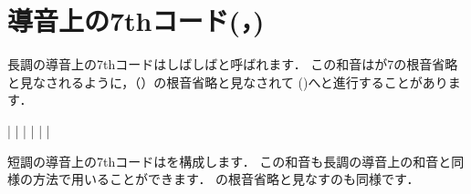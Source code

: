 \documentclass[dvipdfmx,uplatex,b5paper,openany,jbase=12Q,nomag*,textwidth-limit=44%
               ]{gachimuchi}[2020/05/05]
\begin{document}
\section{導音上の7thコード(\texorpdfstring{\Gnvii\hDim{}，\Gnvii\Dim{}}{VII\o7，VIIdim7})}
長調の導音上の7thコードはしばしばと呼ばれます．
この和音は\Gnvii\Dim が\Gnv\subsc7の根音省略と見なされるように，\Gnv{}（）の根音省略と見なされて
\Gni(\Min)へと進行することがあります．

\begin{Music}[0.5\linewidth]
  \Startpiece%
  \NOTEs%
  |%
  \en\bar%
  \NOTEs%
  |%
  \en\doublebar%
  \NOTEs%
  |%
  \en\bar%
  \NOTEs%
  |%
  \en\setdoublebar%
  \endpiece%
\end{Music}

短調の導音上の7thコードはを構成します．
この和音も長調の導音上の和音と同様の方法で用いることができます．
\Gnv{}の根音省略と見なすのも同様です．
\end{document}
